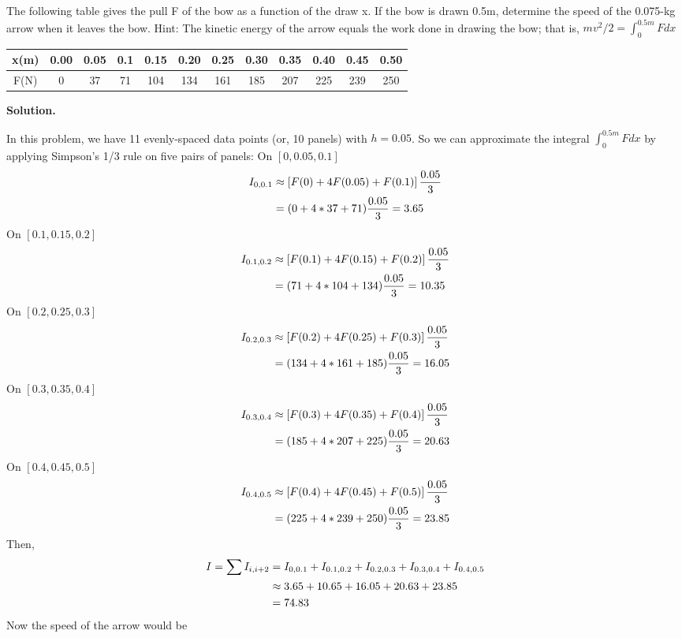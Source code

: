 \begin{exercise}{3} %
The following table gives the pull F of the bow as a function of the draw x. If the bow is drawn 0.5m, determine the speed of the 0.075-kg arrow when it leaves the bow. Hint: The kinetic energy of the arrow equals the work done in drawing the bow; that is, $mv^2/2 = \int_0^{0.5m} Fdx$
\begin{table}[h]
\centering
\begin{tabular}{|c|c|c|c|c|c|c|c|c|c|c|c|}
\hline
x(m) &0.00& 0.05& 0.1& 0.15& 0.20 & 0.25&0.30&0.35&0.40&0.45&0.50\\ \hline
F(N)& 0& 37& 71 &104 &134 &161 &185& 207& 225& 239& 250 \\ \hline
\end{tabular}
\end{table}

\textbf{Solution.} 

In this problem, we have 11 evenly-spaced data points (or, 10 panels) with \(h=0.05\).
So we can approximate the integral  $\int_0^{0.5m} Fdx$ by applying Simpson's 1/3 rule on five pairs of panels:
On \([0,0.05,0.1]\)
 \begin{align}
 I_{0,0.1} &\approx \left[F(0) + 4F(0.05) + F(0.1)\right]\frac{0.05}{3} \notag \\
 &=(0+4*37+71)\frac{0.05}{3} = 3.65 \notag
 \end{align}
On \([0.1,0.15,0.2]\)
 \begin{align}
 I_{0.1,0.2} &\approx \left[F(0.1) + 4F(0.15) + F(0.2)\right]\frac{0.05}{3} \notag \\
 &=(71+4*104+134)\frac{0.05}{3} = 10.35 \notag
 \end{align}
On \([0.2,0.25,0.3]\)
 \begin{align}
 I_{0.2,0.3} &\approx \left[F(0.2) + 4F(0.25) + F(0.3)\right]\frac{0.05}{3} \notag \\
 &=(134+4*161+185)\frac{0.05}{3} = 16.05 \notag
 \end{align}
On \([0.3,0.35,0.4]\)
 \begin{align}
 I_{0.3,0.4} &\approx \left[F(0.3) + 4F(0.35) + F(0.4)\right]\frac{0.05}{3} \notag \\
 &=(185+4*207+225)\frac{0.05}{3} = 20.63 \notag
 \end{align}
On \([0.4,0.45,0.5]\)
 \begin{align}
 I_{0.4,0.5} &\approx \left[F(0.4) + 4F(0.45) + F(0.5)\right]\frac{0.05}{3} \notag \\
 &=(225+4*239+250)\frac{0.05}{3} = 23.85 \notag
 \end{align}
 Then,
 \begin{align}
 I=\sum I_{i,i+2}&= I_{0,0.1}+I_{0.1,0.2}+I_{0.2,0.3}+I_{0.3,0.4}+I_{0.4,0.5}\notag \\
 &\approx 3.65 + 10.65 + 16.05+20.63 + 23.85 \notag \\
 &=74.83 \notag
 \end{align}
 Now the speed of the arrow would be
 

\end{exercise}
